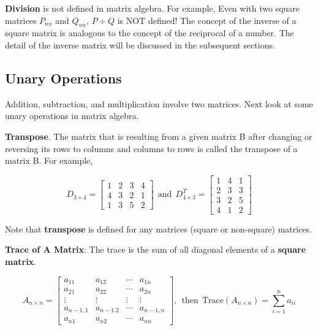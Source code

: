 \documentclass[
]{book}
\begin{document}
\hfill\break

\textbf{Division} is not defined in matrix algebra. For example, Even with two square matrices \(P_{nn}\) and \(Q_{nn}\), \(P \div Q\) is NOT defined! The concept of the inverse of a square matrix is analogous to the concept of the reciprocal of a number. The detail of the inverse matrix will be discussed in the subsequent sections.

\hfill\break

\hypertarget{unary-operations}{%
\subsection{Unary Operations}\label{unary-operations}}

Addition, subtraction, and multiplication involve two matrices. Next look at some unary operations in matrix algebra.

\textbf{Transpose}. The matrix that is resulting from a given matrix B after changing or reversing its rows to columns and columns to rows is called the transpose of a matrix B. For example,

\[
D_{3\times 4} = \left[\begin{array}{ccccc} 
1& 2 & 3 & 4  \\ 
4 & 3 & 2 & 1 \\ 
1 & 3 & 5 & 2  
\end{array}
\right]
~
~
\text{and}
~
~
D^T_{4\times 3} = \left[\begin{array}{ccccc} 
1 & 4 & 1   \\ 
2 & 3 & 3  \\ 
3 & 2 & 5  \\
4 & 1 & 2
\end{array}
\right]
\]

Note that \textbf{transpose} is defined for any matrices (square or non-square) matrices.

\textbf{Trace of A Matrix}: The trace is the sum of all diagonal elements of a \textbf{square matrix}.

\[
A_{n\times n} = \left[\begin{array}{ccccc} 
a_{11} & a_{12} & \cdots & a_{1n}  \\ 
a_{21} & a_{22} & \cdots & a_{2n}  \\ 
\vdots & \vdots & \vdots & \vdots  \\
a_{n-1,1} & a_{n-1.2} & \cdots & a_{n-1,n}  \\
a_{n1} & a_{n2} & \cdots & a_{nn}  
\end{array}
\right],
~
~
\text{then}
~
~
\text{Trace}(A_{n\times n}) = \sum_{i=1}^n a_{ii}
\]
\end{document}
